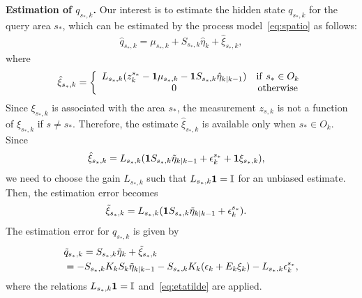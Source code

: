 \documentclass[letterpaper, 10 pt, conference]{ieeeconf}
\begin{document}
\textbf{Estimation of $q_{s_*,k}$.} Our interest is to estimate the hidden state $q_{s_*,k}$ for the query area $s_*$, which can be estimated by the process model~\eqref{eq:spatio} as follows:
\begin{align*}
    \hat{q}_{s_*,k} = \mu_{s_*,k} + S_{s_*,k} \hat{\eta}_k + \hat{\xi}_{s_*,k},
\end{align*}
where %
\begin{align*}
    \hat{\xi}_{s_*,k} = 
    \left\{
    \begin{array}{cc}
         L_{s_*,k} (z_{k}^{s_*} - \bold{1}\mu_{s_*,k} - \bold{1}S_{s_*,k}\hat{\eta}_{k|k-1}) & {\rm if } \ s_* \in O_k \\
         0 & {\rm otherwise}
    \end{array}
    \right.
\end{align*}
Since $\xi_{s_*,k}$ is associated with the area $s_*$, the measurement $z_{s,k}$ is not a function of $\xi_{s_*,k}$ if $s \neq s_*$. Therefore, the estimate $\hat{\xi}_{s_*,k}$ is available only when $s_* \in O_k$.
Since 
\begin{align*}
    \hat{\xi}_{s_*,k}&=L_{s_*,k}(\bold{1}S_{s_*,k}\tilde{\eta}_{k|k-1}+\epsilon_{k}^{s_*}+\bold{1}\xi_{s_*,k}),
\end{align*}
we need to choose the gain $L_{s_*,k}$ such that $L_{s_*,k}\bold{1}=\mathbb{I}$ for an unbiased estimate.
Then, the estimation error becomes
\begin{align}
    \tilde{\xi}_{s_*,k}&=L_{s_*,k}(\bold{1}S_{s_*,k}\tilde{\eta}_{k|k-1}+\epsilon_{k}^{s_*}).
    \label{eq:xitilde}
\end{align}
The estimation error for $q_{s_*,k}$ is given by
\begin{align}
&\tilde{q}_{s_*,k}=S_{s_*,k}\tilde{\eta}_k+\tilde{\xi}_{s_*,k}\nonumber\\
&=-S_{s_*,k}K_kS_k\tilde{\eta}_{k|k-1}-S_{s_*,k}K_k(\epsilon_k+E_k\xi_k)-L_{s_*,k}\epsilon_{k}^{s_*},
\label{eq:ytilde}
\end{align}
where the relations $L_{s_*,k}\bold{1}=\mathbb{I}$ and~\eqref{eq:etatilde} are applied.
\end{document}
